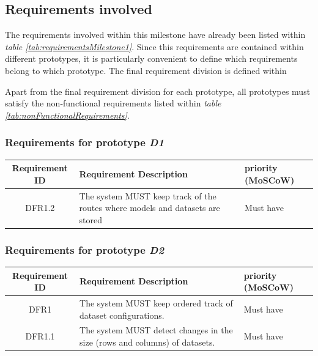 \subsection{Requirements involved}

The requirements involved within this milestone have already been listed within \emph{table \ref{tab:requirementsMilestone1}}. Since this requirements are contained within different prototypes,
it is particularly convenient to define which requirements belong to which prototype. The final requirement division is defined within \

Apart from the final requirement division for each prototype, all prototypes must satisfy the non-functional requirements listed within \emph{table \ref{tab:nonFunctionalRequirements}}.

\subsubsection{Requirements for prototype \emph{D1}}

\begin{table}[H]
    \centering
    \begin{tabular}{ | c | p{9cm} | p{3cm} |}
        \hline
        \textbf{Requirement ID} & \textbf{Requirement Description} & \textbf{priority (MoSCoW)} \\ \hline
        DFR1.2   & The system MUST keep track of the routes where models and datasets are stored    & Must have\\ \hline
    \end{tabular}
\end{table}

\subsubsection{Requirements for prototype \emph{D2}}

\begin{table}[H]
    \centering
    \begin{tabular}{ | c | p{9cm} | p{3cm} |}
        \hline
        \textbf{Requirement ID} & \textbf{Requirement Description} & \textbf{priority (MoSCoW)} \\ \hline
		DFR1     & The system MUST keep ordered track of dataset configurations.                    & Must have\\ \hline
		DFR1.1   & The system MUST detect changes in the size (rows and columns) of datasets.       & Must have\\ \hline
    \end{tabular}
\end{table}

